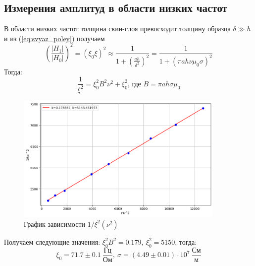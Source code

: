 \documentclass[a4paper, 12pt]{article}
\begin{document}
	\subsection*{Измерения амплитуд в области низких частот}
	В области низких частот толщина скин-слоя превосходит толщину образца $ \delta \gg h$  и из (\ref{eq:svyaz_poley}) получаем
	\begin{equation*}
		\left(\frac{|H_1|}{|H_0|}\right)^2 = (\xi_0\xi)^2 \approx \frac{1}{1+\left(\frac{ah}{\delta^2}\right)^2} = \frac{1}{1 + \left(\pi ah\nu\mu_0\sigma\right)^2}
	\end{equation*}
	Тогда: 
	\begin{equation*}
		\frac{1}{\xi^2}=\xi_0^2B^2\nu^2 + \xi_0^2 \text{, где } B=\pi a h \sigma \mu_0
		\label{eq:liniya_dlya_c}
	\end{equation*}
	\begin{figure}[H]
		\centering
		\includegraphics[width=0.9\textwidth, height = 0.30\textheight]{data/data1.png}
		\caption{График зависимости $1/\xi^2(\nu^2)$}\label{fig:xi_nu_low_freq_linearized}
	\end{figure}
	Получаем следующие значения: $\xi_0^2B^2 = 0.179, \ \xi_0^2 = 5150$, тогда:
	\[\xi_0 = 71.7 \pm 0.1 \ \frac{\text{Гц}}{\text{Ом}}, \ \sigma = (4.49 \pm 0.01) \cdot 10^7 \ \frac{\text{См}}{\text{м}}  \]
	
\end{document}
